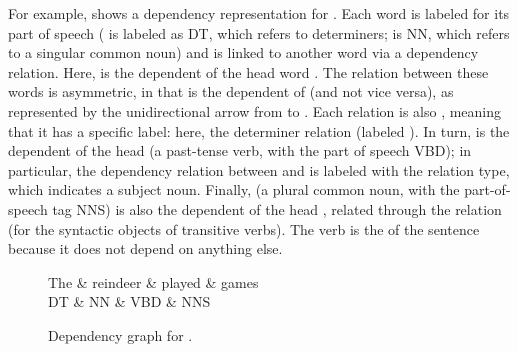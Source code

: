 For example,  shows a dependency representation for .  Each word is labeled for its part of speech ( is labeled as DT, which refers to determiners;  is NN, which refers to a singular common noun) and is linked to another word via a dependency relation.  Here,  is the dependent of the head word .  The relation between these words is asymmetric, in that  is the dependent of  (and not vice versa), as represented by the unidirectional arrow from  to .  Each relation is also , meaning that it has a specific label: here, the determiner relation (labeled ).  In turn,  is the dependent of  the head  (a past-tense verb, with the part of speech VBD); in particular, the dependency relation between  and  is labeled with the   relation type, which indicates a subject noun.  Finally,  (a plural common noun, with the part-of-speech tag NNS) is also the dependent of the head , related through the  relation (for the syntactic objects of transitive verbs).  The verb   is the  of the sentence because it does not depend on anything else.


\begin{figure}
  \begin{dependency}[theme = simple, label style={scale=1.5}]   \begin{deptext}[column sep=1em]
    The \& reindeer \& played \& games\\
    DT \& NN \& VBD \& NNS\\
   \end{deptext}
   \end{dependency}
\caption{Dependency graph for .}
\label{fig:reindeerdep}
\end{figure}


